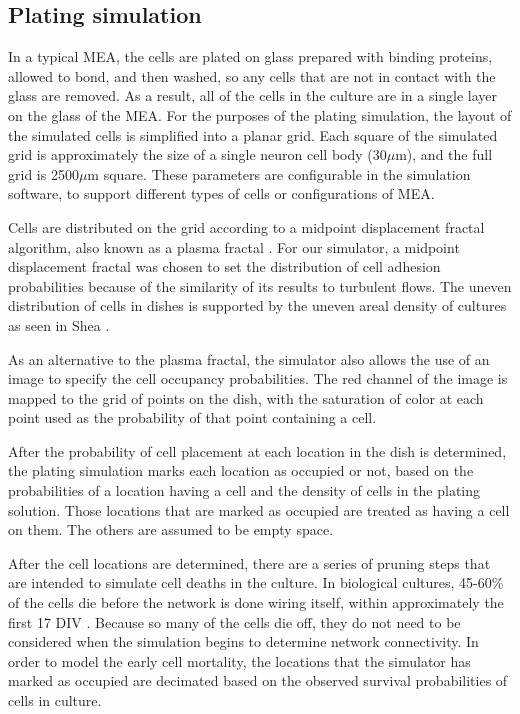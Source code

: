 \documentclass[letterpaper]{article}
\begin{document}
\subsection{Plating simulation}

In a typical MEA, the cells are plated on glass prepared with binding proteins, allowed to bond, and then washed, so any cells that are not in contact with the glass are removed.
As a result, all of the cells in the culture are in a single layer on the glass of the MEA.
For the purposes of the plating simulation, the layout of the simulated cells is simplified into a planar grid. 
Each square of the simulated grid is approximately the size of a single neuron cell body (30$\mu$m), and the full grid is 2500$\mu$m square.
These parameters are configurable in the simulation software, to support different types of cells or configurations of MEA.

Cells are distributed on the grid according to a midpoint displacement fractal algorithm, also known as a plasma fractal \cite{Fournier1982Stochastic}. 
For our simulator, a midpoint displacement fractal was chosen to set the distribution of cell adhesion probabilities because of the similarity of its results to turbulent flows. 
The uneven distribution of cells in dishes is supported by the uneven areal density of cultures as seen in Shea \citeyear{shea2009optimization}. 

As an alternative to the plasma fractal, the simulator also allows the use of an image to specify the cell occupancy probabilities. 
The red channel of the image is mapped to the grid of points on the dish, with the saturation of color at each point used as the probability of that point containing a cell. 

After the probability of cell placement at each location in the dish is determined, the plating simulation marks each location as occupied or not, based on the probabilities of a location having a cell and the density of cells in the plating solution. 
Those locations that are marked as occupied are treated as having a cell on them. The others are assumed to be empty space. 

After the cell locations are determined, there are a series of pruning steps that are intended to simulate cell deaths in the culture. 
In biological cultures, 45-60\% of the cells die before the network is done wiring itself, within approximately the first 17 DIV \cite{erickson2008caged}.
Because so many of the cells die off, they do not need to be considered when the simulation begins to determine network connectivity. 
In order to model the early cell mortality, the locations that the simulator has marked as occupied are decimated based on the observed survival probabilities of cells in culture. 
\end{document}
